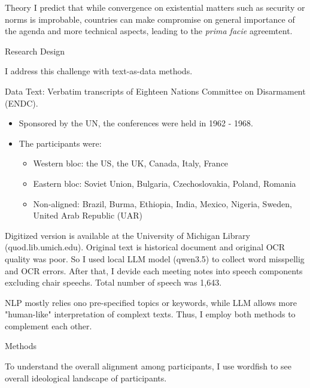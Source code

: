 \documentclass[final]{beamer}
\newlength{\colwidth}
\begin{document}
\begin{frame}[t]
\begin{columns}[t]
\begin{column}{\colwidth}
\begin{block}{Theory}
    I predict that while convergence on existential matters such as security or norms is improbable, countries can make compromise on general importance of the agenda and more technical aspects, leading to the \textit{prima facie} agreemtent.

  \end{block}

  \begin{block}{Research Design}

    I address this challenge with text-as-data methods.

    \begin{alertblock}{Data}
      Text: Verbatim transcripts of Eighteen Nations Committee on Disarmament (ENDC).

    \begin{itemize}
      \item Sponsored by the UN, the conferences were held in 1962 - 1968.
      \item The participants were:
      \begin{itemize}
        \item Western bloc: the US, the UK, Canada, Italy, France
        \item Eastern bloc: Soviet Union, Bulgaria, Czechoslovakia, Poland, Romania
        \item Non-aligned: Brazil, Burma, Ethiopia, India, Mexico, Nigeria, Sweden, United Arab Republic (UAR)
      \end{itemize}
    \end{itemize}

    Digitized version is available at the University of Michigan Library (quod.lib.umich.edu). Original text is historical document and original OCR quality was poor. So I used local LLM model (qwen3.5) to collect word misspellig and OCR errors. After that, I devide each meeting notes into speech components excluding chair speechs. Total number of speech was 1,643.

    \end{alertblock}
    
    NLP mostly relies ono pre-specified topics or keywords, while LLM allows more "human-like" interpretation of complext texts. Thus, I employ both methods to complement each other.

    \begin{alertblock}{Methods}

      To understand the overall alignment among participants, I use wordfish \parencite{Slapin2008-gs} to see overall ideological landscape of participants.


\end{alertblock}
\end{block}
\end{column}
\end{columns}
\end{frame}
\end{document}

